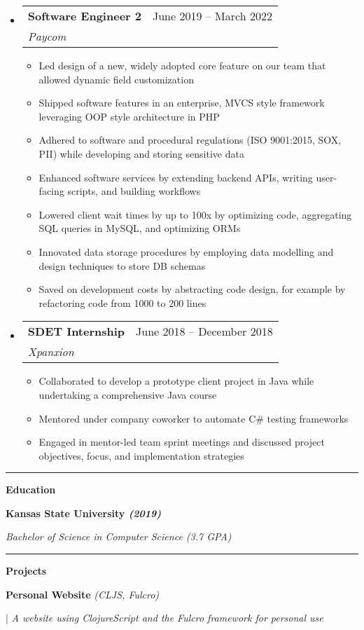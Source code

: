 \documentclass[letterpaper,11pt]{article}
\makeatletter
\newcommand{\resumeItem}[1]{
  \item\small{
    {#1 \vspace{-2pt}}
  }
}
\newcommand{\resumeSubheading}[4]{
  \vspace{-2pt}\item
    \begin{tabular*}{0.97\textwidth}[t]{l@{\extracolsep{\fill}}r}
      \textbf{#1} & #2 \\
      \textit{\small#3} & \textit{\small #4} \\
    \end{tabular*}\vspace{0pt}
}
\newcommand{\resumeSubHeadingListStart}{\begin{itemize}[leftmargin=0.15cm, label={}]}
\newcommand{\resumeSubHeadingListEnd}{\end{itemize}}
\newcommand{\resumeItemListStart}{\begin{itemize}}
\newcommand{\resumeItemListEnd}{\end{itemize}\vspace{-5pt}}
\makeatother
\begin{document}
\resumeSubHeadingListStart
\resumeSubheading
{Software Engineer 2}{June 2019 – March 2022}
{Paycom}{}
\resumeItemListStart
\resumeItem{ Led design of a new, widely adopted core feature on our team that allowed dynamic field customization }
\resumeItem{ Shipped software features in an enterprise, MVCS style framework leveraging OOP style architecture in PHP}
\resumeItem{ Adhered to software and procedural regulations (ISO 9001:2015, SOX, PII) while developing and storing sensitive data }
\resumeItem{ Enhanced software services by extending backend APIs, writing user-facing scripts, and building workflows }
\resumeItem{ Lowered client wait times by up to 100x by optimizing code, aggregating SQL queries in MySQL, and optimizing ORMs }
\resumeItem{ Innovated data storage procedures by employing data modelling and design techniques to store DB schemas }
\resumeItem{ Saved on development costs by abstracting code design, for example by refactoring code from 1000 to 200 lines }
\resumeItemListEnd
\resumeSubHeadingListEnd
\resumeSubHeadingListStart
\resumeSubheading
{SDET Internship}{June 2018 – December 2018}
{Xpanxion}{}
\resumeItemListStart
\resumeItem{ Collaborated to develop a prototype client project in Java while undertaking a comprehensive Java course }
\resumeItem{ Mentored under company coworker to automate C\# testing frameworks }
\resumeItem{ Engaged in mentor-led team sprint meetings and discussed project objectives, focus, and implementation strategies }
\resumeItemListEnd
\resumeSubHeadingListEnd
\noindent\rule{19.5cm}{0.4pt}

\textbf{\large \textcolor{magic_blue}{Education}}

\begin{minipage}[t]{0.45\textwidth}
	\raggedright
	\textbf{ Kansas State University \textit{(2019)}} \\
\end{minipage}
\hfill
\begin{minipage}[t]{0.45\textwidth}
	\raggedleft
	\textit{Bachelor of Science in Computer Science (3.7 GPA)} \\
\end{minipage}
\noindent\rule{19.5cm}{0.4pt}

\textbf{\large \textcolor{magic_blue}{Projects}}

\begin{minipage}[t]{0.28\textwidth}
	\raggedright
	\textbf{ Personal Website }\textit{(CLJS, Fulcro)} \\
\end{minipage}
\hfill
\begin{minipage}[t]{0.70\textwidth}
	\raggedright
	|\textit{ A website using ClojureScript and the Fulcro framework for personal use} \\
\end{minipage}
\end{document}
